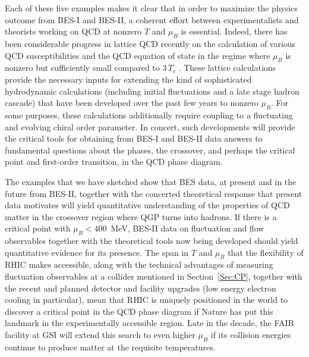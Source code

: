 
Each of these five examples makes it clear that in order to maximize
the physics outcome from BES-I and BES-II, a coherent effort between
experimentalists and theorists working on QCD at nonzero $T$ and
$\mu_B$ is essential.
Indeed,
there has been considerable progress in lattice QCD recently on the
calculation of various QCD susceptibilities
\cite{Borsanyi:2011sw,Bazavov:2012jq} and the QCD equation of state in
the regime where $\mu_B$ is nonzero but sufficiently small compared to
$3\,T_c$ \cite{Borsanyi:2012cr,Hegde:2014wga}. These lattice
calculations provide the necessary inputs for extending 
the kind of sophisticated hydrodynamic calculations (including
initial fluctuations and a late stage hadron cascade) that have been
developed over the past few years to nonzero $\mu_B$. For some purposes, these
calculations additionally require coupling to a fluctuating and evolving
chiral order parameter.
%
In concert, such developments will provide the critical tools for
obtaining from BES-I and BES-II data answers to fundamental questions
about the phases, the crossover, and perhaps the critical point and
first-order transition, in the QCD phase diagram. 


The examples that we have sketched show that BES data,
at present and in the future from BES-II, 
together with the concerted theoretical response that present
data motivates will yield quantitative
understanding of the properties of QCD matter in the crossover region
where QGP turns into hadrons. 
If there is a critical
point with $\mu_B<400$~MeV, BES-II data on fluctuation and flow 
observables together with the theoretical
tools now being developed should yield quantitative evidence for its
presence.  
%
The span in $T$ and $\mu_B$ that the flexibility of RHIC
makes accessible, along with the technical advantages of
measuring fluctuation observables at a collider mentioned in Section~\ref{Sec:CP},
together with the 
recent and planned
detector and facility upgrades (low energy electron cooling in particular), 
mean that RHIC is uniquely positioned in the world 
to discover a critical point in the
QCD phase diagram if Nature has put this landmark in the
experimentally accessible region. Late in the decade, the FAIR
facility at GSI\cite{FAIR} will extend this search to even higher $\mu_B$ if its
collision energies continue to produce matter at the requisite
temperatures.
